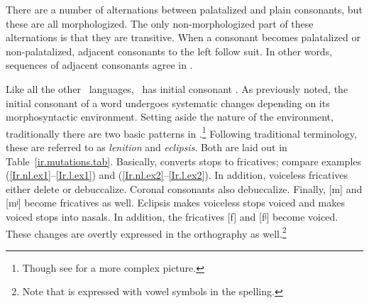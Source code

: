 \documentclass[output=paper,colorlinks,citecolor=brown]{langscibook}
\begin{document}
There are a number of alternations between palatalized and plain consonants, but these are all morphologized. The only non-morphologized part of these alternations is that they are transitive. When a consonant becomes palatalized or non-palatalized, adjacent consonants to the left follow suit. In other words, sequences of adjacent consonants agree in .

Like all the other \ce\ languages, \ir\ has initial consonant \m{}. As previously noted, the initial consonant of a word undergoes systematic changes depending on its morphosyntactic environment. Setting aside the nature of the environment, traditionally there are two basic \m{} patterns in \ir.\footnote{Though see \citet{carnie} for a more complex picture.} Following traditional terminology, these are referred to as \emph{lenition} and \emph{eclipsis}. Both are laid out in Table~\ref{ir.mutations.tab}. Basically,  converts stops to fricatives; compare examples (\ref{Ir.nl.ex1}--\ref{Ir.l.ex1}) and (\ref{Ir.nl.ex2}--\ref{Ir.l.ex2}). In addition, voiceless fricatives either delete or debuccalize. Coronal consonants also debuccalize. Finally, [m] and [mʲ] become fricatives as well. Eclipsis makes voiceless stops voiced and makes voiced stops into nasals. In addition, the fricatives [f] and [fʲ] become voiced. These changes are overtly expressed in the orthography as well.\footnote{Note that  is expressed with vowel symbols in the spelling.}
\end{document}
